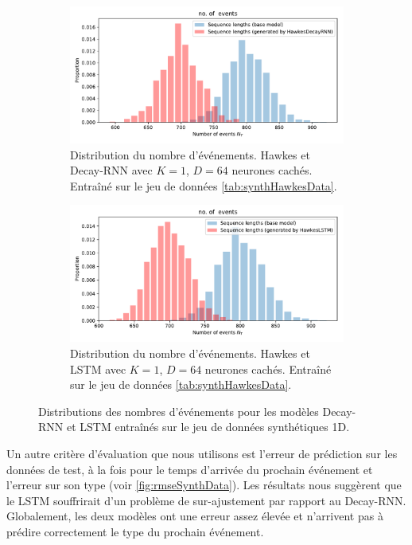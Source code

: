 \documentclass[../main.tex]{subfiles}
\begin{document}
\begin{figure}[ht]
	\begin{subfigure}{\linewidth}
		\includegraphics[width=\linewidth]{../results/length_distrib_HawkesDecayRNN-1d-hidden_64-20181206-234848.pdf}
		\caption{Distribution du nombre d'événements. Hawkes et Decay-RNN avec $K=1$, $D=64$ neurones cachés. Entraîné sur le jeu de données \autoref{tab:synthHawkesData}.}\label{fig:1DRNNlengthDistrib}
	\end{subfigure}
	\begin{subfigure}{\linewidth}
		\includegraphics[width=\linewidth]{../results/length_distrib_HawkesLSTM-1d-hidden64-20181206-235311.pdf}
		\caption{Distribution du nombre d'événements. Hawkes et LSTM avec $K=1$, $D=64$ neurones cachés. Entraîné sur le jeu de données \autoref{tab:synthHawkesData}.}\label{fig:1DLSTMlengthDistrib}	
	\end{subfigure}
	\caption{Distributions des nombres d'événements pour les modèles Decay-RNN et LSTM entraînés sur le jeu de données synthétiques 1D.}\label{fig:1DlengthDistrib}
\end{figure}

Un autre critère d'évaluation que nous utilisons est l'erreur de prédiction sur les données de test, à la fois pour le temps d'arrivée du prochain événement et l'erreur sur son type (voir \autoref{fig:rmseSynthData}). Les résultats nous suggèrent que le LSTM souffrirait d'un problème de sur-ajustement par rapport au Decay-RNN. Globalement, les deux modèles ont une erreur assez élevée et n'arrivent pas à prédire correctement le type du prochain événement.
\end{document}
